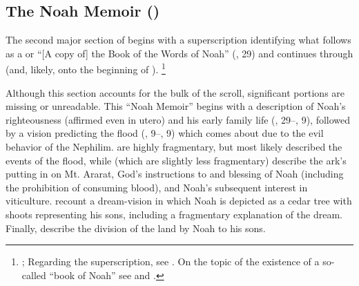\subsection{The Noah Memoir ()}
The second major section of \ga begins with a superscription identifying what follows as a  or ``[A copy of] the Book of the Words of Noah'' (, 29) and continues through  (and, likely, onto the beginning of ).%
    \footnote{\Cite[174--175]{nickelsburg2005};
        Regarding the superscription, see \cite{steiner_dsd1995}.
        On the topic of the existence of a so-called ``book of Noah'' see 
        \cite{dimant_vanderkam-etal2006} and \cite{werman_chazon-etal1999}.}

Although this section accounts for the bulk of the scroll, significant portions are missing or unreadable. This ``Noah Memoir'' begins with a description of Noah's righteousness%
    \autocite{vanderkam_collins-nickelsburg1980}
(affirmed even in utero) and his early family life (, 29--, 9), followed by a vision predicting the flood (, 9--, 9) which comes about due to the evil behavior of the Nephilim.  are highly fragmentary, but most likely described the events of the flood, while  (which are slightly less fragmentary) describe the ark's putting in on Mt. Ararat, God's instructions to  and blessing of Noah (including the prohibition of consuming blood), and Noah's subsequent interest in viticulture.  recount a dream-vision in which Noah is depicted as a cedar tree with shoots representing his sons, including a fragmentary explanation of the dream. Finally,  describe the division of the land by Noah to his sons.

